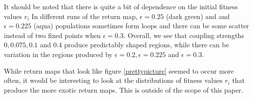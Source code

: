 \documentclass[conference]{IEEEtran}
\begin{document}
It should be noted that there is quite a bit of dependence on the initial fitness values $r_i$   In different runs of the return map, $\epsilon = 0.25$ (dark green) and and $\epsilon = 0.225$ (aqua) populations sometimes form loops and there can be some scatter instead of two fixed points when $\epsilon = 0.3$.  Overall, we see that coupling strengths $0, 0.075, 0.1$ and $0.4$ produce predictably shaped regions, while there can be variation in the regions produced by $\epsilon = 0.2,  \epsilon = 0.225$ and $\epsilon = 0.3$. 


    

While return maps that look like figure \ref{prettypicture} seemed to occur more often, it would be interesting to look at the distributions of fitness values $r_i$ that produce the more exotic return maps.  This is outside of the scope of this paper.
\end{document}
